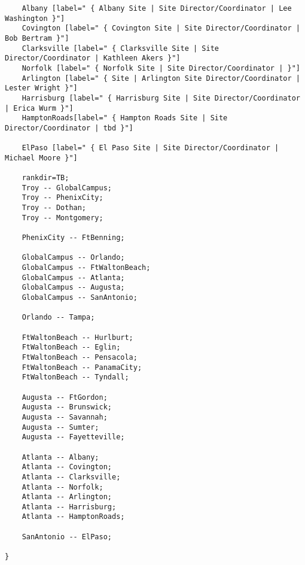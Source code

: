 \documentclass{article}
\begin{document}
\begin{lstlisting}
    Albany [label=" { Albany Site | Site Director/Coordinator | Lee Washington }"]
    Covington [label=" { Covington Site | Site Director/Coordinator | Bob Bertram }"]
    Clarksville [label=" { Clarksville Site | Site Director/Coordinator | Kathleen Akers }"]
    Norfolk [label=" { Norfolk Site | Site Director/Coordinator | }"]
    Arlington [label=" { Site | Arlington Site Director/Coordinator | Lester Wright }"]
    Harrisburg [label=" { Harrisburg Site | Site Director/Coordinator | Erica Wurm }"]
    HamptonRoads[label=" { Hampton Roads Site | Site Director/Coordinator | tbd }"]

    ElPaso [label=" { El Paso Site | Site Director/Coordinator | Michael Moore }"]

    rankdir=TB;
    Troy -- GlobalCampus;
    Troy -- PhenixCity;
    Troy -- Dothan;
    Troy -- Montgomery;

    PhenixCity -- FtBenning;

    GlobalCampus -- Orlando;
    GlobalCampus -- FtWaltonBeach;
    GlobalCampus -- Atlanta;
    GlobalCampus -- Augusta;
    GlobalCampus -- SanAntonio;

    Orlando -- Tampa;

    FtWaltonBeach -- Hurlburt;
    FtWaltonBeach -- Eglin;
    FtWaltonBeach -- Pensacola;
    FtWaltonBeach -- PanamaCity;
    FtWaltonBeach -- Tyndall;

    Augusta -- FtGordon;
    Augusta -- Brunswick;
    Augusta -- Savannah;
    Augusta -- Sumter;
    Augusta -- Fayetteville;

    Atlanta -- Albany;
    Atlanta -- Covington;
    Atlanta -- Clarksville;
    Atlanta -- Norfolk;
    Atlanta -- Arlington;
    Atlanta -- Harrisburg;
    Atlanta -- HamptonRoads;

    SanAntonio -- ElPaso;

}
\end{lstlisting}
\end{document}
